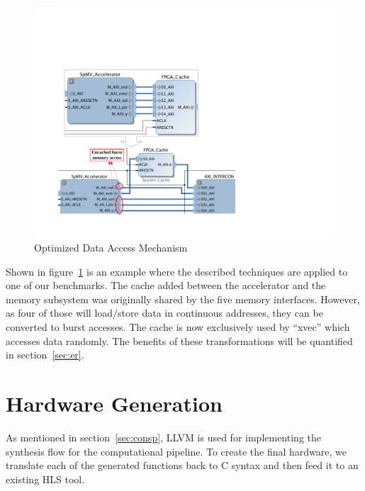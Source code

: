 \begin{figure}[htp]
\begin{center}
\includegraphics[width=0.65\linewidth]{chap3fig/memOptConv.pdf}
\caption{Optimized Data Access Mechanism
\label{fig:from2}}
\end{center}
\end{figure}
Shown in figure~\ref{fig:from2} is an example where the described techniques are applied to one of our benchmarks.
The cache added between the accelerator and the memory subsystem was originally shared by the five memory
interfaces. However,
as four of those will load/store data in continuous addresses, they can be converted to burst accesses.
The cache is now exclusively used by ``xvec'' which accesses data randomly. The benefits of these transformations
will be quantified in section~\ref{sec:er}.


\section{Hardware Generation}
As mentioned in section~\ref{sec:consp}, LLVM is used for implementing the synthesis flow for the computational pipeline. 
To create the final hardware, we translate each of the generated functions back to C syntax and then feed it to an existing HLS tool.


